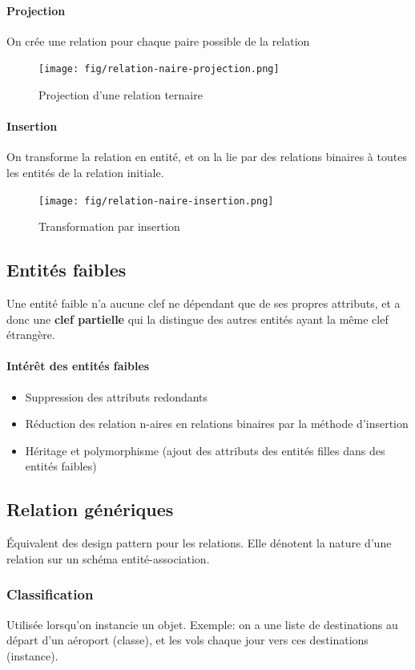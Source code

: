 \documentclass[a4paper]{article}
\begin{document}
\paragraph{Projection}
On crée une relation pour chaque paire possible de la relation
\begin{figure}[H]
    \center
    \texttt{[image: fig/relation-naire-projection.png]}
    \caption{\label{fig:relation-naire-projection}Projection d'une relation ternaire}
\end{figure}

\paragraph{Insertion}
On transforme la relation en entité, et on la lie par des relations binaires à
toutes les entités de la relation initiale.
\begin{figure}[H]
    \center
    \texttt{[image: fig/relation-naire-insertion.png]}
    \caption{Transformation par insertion}
\end{figure}

\subsection{Entités faibles}
Une entité faible n'a aucune clef ne dépendant que de ses propres attributs, et
a donc une \textbf{clef partielle} qui la distingue des autres entités ayant la
même clef étrangère.

\paragraph{Intérêt des entités faibles}
\begin{itemize}
  \item Suppression des attributs redondants
  \item Réduction des relation n-aires en relations binaires par la méthode d'insertion
  \item Héritage et polymorphisme (ajout des attributs des entités filles dans des entités faibles)
\end{itemize}

\subsection{Relation génériques}
\'Equivalent des design pattern pour les relations. Elle dénotent la nature d'une
relation sur un schéma entité-association.

\subsubsection{Classification}
Utilisée lorsqu'on instancie un objet. Exemple: on a une liste de destinations
au départ d'un aéroport (classe), et les vols chaque jour vers ces destinations (instance).
\end{document}
